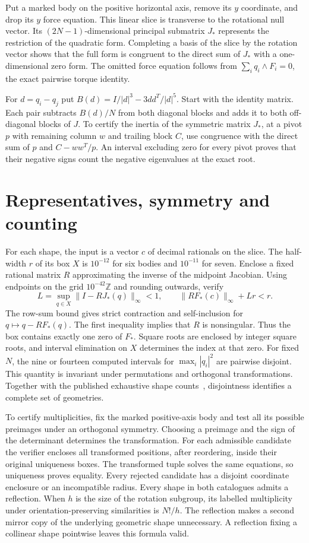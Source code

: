 \documentclass[10pt]{article}
\begin{document}
Put a marked body on the positive horizontal axis, remove its $y$ coordinate, and drop its $y$ force equation. This linear slice is transverse to the rotational null vector. Its $(2N-1)$-dimensional principal submatrix $J_*$ represents the restriction of the quadratic form. Completing a basis of the slice by the rotation vector shows that the full form is congruent to the direct sum of $J_*$ with a one-dimensional zero form. The omitted force equation follows from $\sum_i q_i\wedge F_i=0$, the exact pairwise torque identity.

For $d=q_i-q_j$ put $B(d)=I/|d|^3-3dd^T/|d|^5$. Start with the identity matrix. Each pair subtracts $B(d)/N$ from both diagonal blocks and adds it to both off-diagonal blocks of $J$. To certify the inertia of the symmetric matrix $J_*$, at a pivot $p$ with remaining column $w$ and trailing block $C$, use congruence with the direct sum of $p$ and $C-ww^T/p$. An interval excluding zero for every pivot proves that their negative signs count the negative eigenvalues at the exact root.

\section{Representatives, symmetry and counting}
For each shape, the input is a vector $c$ of decimal rationals on the slice. The half-width $r$ of its box $X$ is $10^{-12}$ for six bodies and $10^{-11}$ for seven. Enclose a fixed rational matrix $R$ approximating the inverse of the midpoint Jacobian. Using endpoints on the grid $10^{-42}\mathbb Z$ and rounding outwards, verify
\[
 L=\sup_{q\in X}\lVert I-RJ_*(q)\rVert_\infty<1,\qquad
 \lVert RF_*(c)\rVert_\infty+Lr<r .
\]
The row-sum bound gives strict contraction and self-inclusion for $q\mapsto q-RF_*(q)$. The first inequality implies that $R$ is nonsingular. Thus the box contains exactly one zero of $F_*$. Square roots are enclosed by integer square roots, and interval elimination on $X$ determines the index at that zero. For fixed $N$, the nine or fourteen computed intervals for $\max_i |q_i|^2$ are pairwise disjoint. This quantity is invariant under permutations and orthogonal transformations. Together with the published exhaustive shape counts~\cite{mz}, disjointness identifies a complete set of geometries.

To certify multiplicities, fix the marked positive-axis body and test all its possible preimages under an orthogonal symmetry. Choosing a preimage and the sign of the determinant determines the transformation. For each admissible candidate the verifier encloses all transformed positions, after reordering, inside their original uniqueness boxes. The transformed tuple solves the same equations, so uniqueness proves equality. Every rejected candidate has a disjoint coordinate enclosure or an incompatible radius. Every shape in both catalogues admits a reflection. When $h$ is the size of the rotation subgroup, its labelled multiplicity under orientation-preserving similarities is $N!/h$. The reflection makes a second mirror copy of the underlying geometric shape unnecessary. A reflection fixing a collinear shape pointwise leaves this formula valid.
\end{document}
